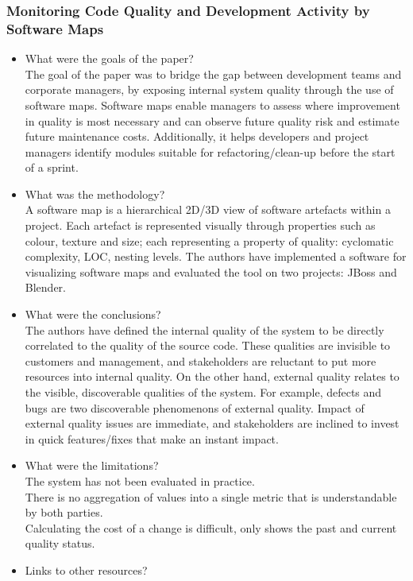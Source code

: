 \documentclass{mprop}
\begin{document}
\subsubsection{Monitoring Code Quality and Development Activity by Software Maps} \cite{Bohnet2011}
\begin{itemize}
	\item What were the goals of the paper? \\
	      The goal of the paper was to bridge the gap between development teams and corporate managers, by exposing internal system quality through the use of software maps.
	      Software maps enable managers to assess where improvement in quality is most necessary and can observe future quality risk and estimate future maintenance costs.
	      Additionally, it helps developers and project managers identify modules suitable for refactoring/clean-up before the start of a sprint.
	\item What was the methodology? \\
	      A software map is a hierarchical 2D/3D view of software artefacts within a project.
	      Each artefact is represented visually through properties such as colour, texture and size; each representing a property of quality: cyclomatic complexity, LOC, nesting levels.
	      The authors have implemented a software for visualizing software maps and evaluated the tool on two projects: JBoss and Blender.
	\item What were the conclusions? \\
	      The authors have defined the internal quality of the system to be directly correlated to the quality of the source code.
	      These qualities are invisible to customers and management, and stakeholders are reluctant to put more resources into internal quality.
	      On the other hand, external quality relates to the visible, discoverable qualities of the system.
	      For example, defects and bugs are two discoverable phenomenons of external quality.
	      Impact of external quality issues are immediate, and stakeholders are inclined to invest in quick features/fixes that make an instant impact.
	\item What were the limitations? \\
	      The system has not been evaluated in practice.\\
	      There is no aggregation of values into a single metric that is understandable by both parties.\\
	      Calculating the cost of a change is difficult, only shows the past and current quality status.
	\item Links to other resources? \\
\end{itemize}
\end{document}
